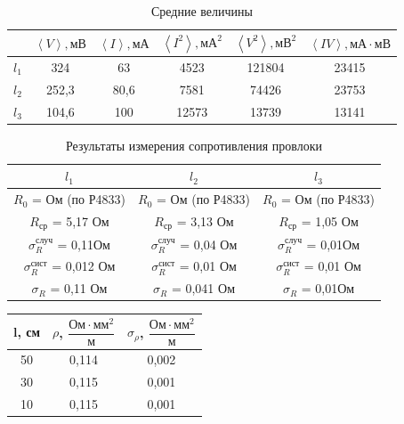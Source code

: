 \documentclass[a4paper, 10pt]{article}%
\begin{document}
\newpage
\begin{table}
\caption{Средние величины}
\begin{tabular}{|r|c|c|c|c|c|}
\hline
&$\left\langle V \right\rangle, \text{мВ}$ & $\left\langle I \right\rangle, \text{мА}$ & $\left\langle I^2 \right\rangle, \text{мА}^2$ & $\left\langle  V^2 \right\rangle, \text{мВ}^2$  & $\left\langle IV \right\rangle, \text{мА}\cdot\text{мВ}$ \\
\hline
$l_1$& 324 & 63 & 4523 & 121804 & 23415\\
\hline
$l_2$& 252,3 & 80,6 & 7581 & 74426 & 23753\\
\hline
$l_3$& 104,6 & 100 & 12573 & 13739 & 13141\\
\hline
\end{tabular}
\end{table}
\begin{table}
\caption{Результаты измерения сопротивления провлоки}
\begin{tabular}{|c|c|c|}
\hline
$l_1$&$l_2$&$l_3$ \\
\hline
$R_0$ = Ом (по Р4833) & $R_0$ = Ом (по Р4833) & $R_0$ = Ом (по Р4833) \\
$R_\text{ср}$ = 5,17 Ом  & $R_\text{ср}$ = 3,13 Ом  & $R_\text{ср}$ = 1,05 Ом  \\
$\sigma^{\text{случ}}_{R}$ = 0,11Ом & $\sigma^{\text{случ}}_{R}$ = 0,04 Ом &  $\sigma^{\text{случ}}_{R}$ = 0,01Ом \\
$\sigma^{\text{сист}}_{R}$ = 0,012 Ом & $\sigma^{\text{сист}}_{R}$ = 0,01 Ом &  $\sigma^{\text{сист}}_{R}$ = 0,01 Ом \\
$\sigma_{R}$ = 0,11 Ом & $\sigma_{R}$ = 0,041 Ом & $\sigma_{R}$ = 0,01Ом \\
\hline
\end{tabular}
\end{table}
\begin{table}
\begin{tabular}{|c|c|c|}
\hline
l, см& $\rho$, $\dfrac{\text{Ом} \cdot \text{мм}^2}{\text{м}}$& $\sigma_{\rho}$, $\dfrac{\text{Ом} \cdot \text{мм}^2}{\text{м}}$ \\
\hline
 50  & 0,114 & 0,002\\
 30  & 0,115 & 0,001\\
 10  & 0,115 & 0,001\\
\hline
\end{tabular}
\end{table}
\end{document}
